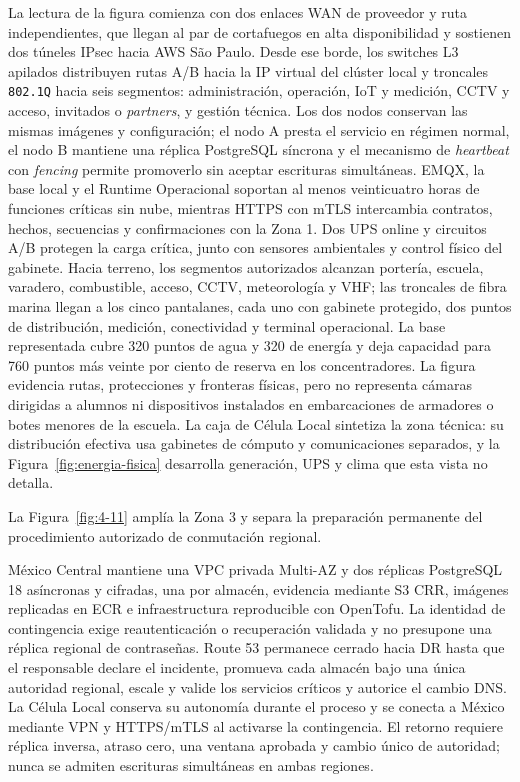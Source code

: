 La lectura de la figura comienza con dos enlaces WAN de proveedor y ruta independientes, que llegan al par de cortafuegos en alta disponibilidad y sostienen dos túneles IPsec hacia AWS São Paulo. Desde ese borde, los switches L3 apilados distribuyen rutas A/B hacia la IP virtual del clúster local y troncales \texttt{802.1Q} hacia seis segmentos: administración, operación, IoT y medición, CCTV y acceso, invitados o \emph{partners}, y gestión técnica. Los dos nodos conservan las mismas imágenes y configuración; el nodo A presta el servicio en régimen normal, el nodo B mantiene una réplica PostgreSQL síncrona y el mecanismo de \emph{heartbeat} con \emph{fencing} permite promoverlo sin aceptar escrituras simultáneas. EMQX, la base local y el Runtime Operacional soportan al menos veinticuatro horas de funciones críticas sin nube, mientras HTTPS con mTLS intercambia contratos, hechos, secuencias y confirmaciones con la Zona 1. Dos UPS online y circuitos A/B protegen la carga crítica, junto con sensores ambientales y control físico del gabinete. Hacia terreno, los segmentos autorizados alcanzan portería, escuela, varadero, combustible, acceso, CCTV, meteorología y VHF; las troncales de fibra marina llegan a los cinco pantalanes, cada uno con gabinete protegido, dos puntos de distribución, medición, conectividad y terminal operacional. La base representada cubre 320 puntos de agua y 320 de energía y deja capacidad para 760 puntos más veinte por ciento de reserva en los concentradores. La figura evidencia rutas, protecciones y fronteras físicas, pero no representa cámaras dirigidas a alumnos ni dispositivos instalados en embarcaciones de armadores o botes menores de la escuela. La caja de Célula Local sintetiza la zona técnica: su distribución efectiva usa gabinetes de cómputo y comunicaciones separados, y la Figura~\ref{fig:energia-fisica} desarrolla generación, UPS y clima que esta vista no detalla.

La Figura~\ref{fig:4-11} amplía la Zona 3 y separa la preparación permanente del procedimiento autorizado de conmutación regional.



México Central mantiene una VPC privada Multi-AZ y dos réplicas PostgreSQL 18 asíncronas y cifradas, una por almacén, evidencia mediante S3 CRR, imágenes replicadas en ECR e infraestructura reproducible con OpenTofu. La identidad de contingencia exige reautenticación o recuperación validada y no presupone una réplica regional de contraseñas. Route 53 permanece cerrado hacia DR hasta que el responsable declare el incidente, promueva cada almacén bajo una única autoridad regional, escale y valide los servicios críticos y autorice el cambio DNS. La Célula Local conserva su autonomía durante el proceso y se conecta a México mediante VPN y HTTPS/mTLS al activarse la contingencia. El retorno requiere réplica inversa, atraso cero, una ventana aprobada y cambio único de autoridad; nunca se admiten escrituras simultáneas en ambas regiones.

